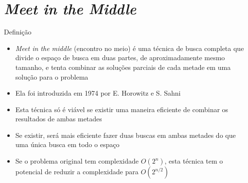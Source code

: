 \section{\it Meet in the Middle}

\begin{frame}[fragile]{Definição}

    \begin{itemize}
        \item \textit{Meet in the middle} (encontro no meio) é uma técnica de busca completa que
            divide o espaço de busca em duas partes, de aproximadamente mesmo tamanho, e tenta
            combinar as soluções parciais de cada metade em uma solução para o problema 

        \item Ela foi introduzida em 1974 por E. Horowitz e S. Sahni

        \item Esta técnica só é viável se existir uma maneira eficiente de combinar os resultados
            de ambas metades

        \item Se existir, será mais eficiente fazer duas buscas em ambas metades do que uma única
            busca em todo o espaço

        \item Se o problema original tem complexidade $O(2^n)$, esta técnica tem o potencial
            de reduzir a complexidade para $O(2^{n/2})$

    \end{itemize}

\end{frame}
